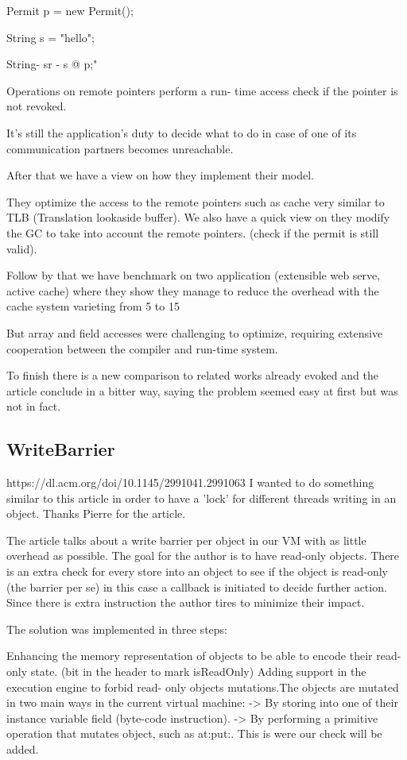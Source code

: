 \documentclass[11pt]{article} %
\begin{document}
Permit p = new Permit();

String s = "hello";

String- sr - s @ p;"

Operations on remote pointers perform a run- time access check if the pointer is not revoked.

It's still the application's duty to decide what to do in case of one of its communication partners becomes unreachable.


After that we have a view on how they implement their model.

They optimize the access to the remote pointers such as cache very similar to TLB (Translation lookaside buffer).
We also have a quick view on they modify the GC to take into account the remote pointers. (check if the permit is still valid).


Follow by that we have benchmark on two application (extensible web serve, active cache) where they show they manage to reduce the overhead with the cache system varieting from 5 to 15%

But array and field accesses were challenging to optimize, requiring extensive cooperation between the compiler and run-time system.


To finish there is a new comparison to related works already evoked and the article conclude in a bitter way, saying the problem seemed easy at first but was not in fact.

\subsection{WriteBarrier}
https://dl.acm.org/doi/10.1145/2991041.2991063
I wanted to do something similar to this article in order to have a 'lock' for different threads writing in an object.
Thanks Pierre for the article.

The article talks about a write barrier per object in our VM with as little overhead as possible. The goal for the author is to have read-only objects. There is an extra check for every store into an object to see if the object is read-only (the barrier per se) in this case a callback is initiated to decide further action. Since there is extra instruction the author tires to minimize their impact.

The solution was implemented in three steps:

    Enhancing the memory representation of objects to be able to encode their read-only state. (bit in the header to mark isReadOnly)
    Adding support in the execution engine to forbid read- only objects mutations.The objects are mutated in two main ways in the current virtual machine:
    -> By storing into one of their instance variable field (byte-code instruction).
    -> By performing a primitive operation that mutates object, such as at:put:.
    This is were our check will be added.
\end{document}
